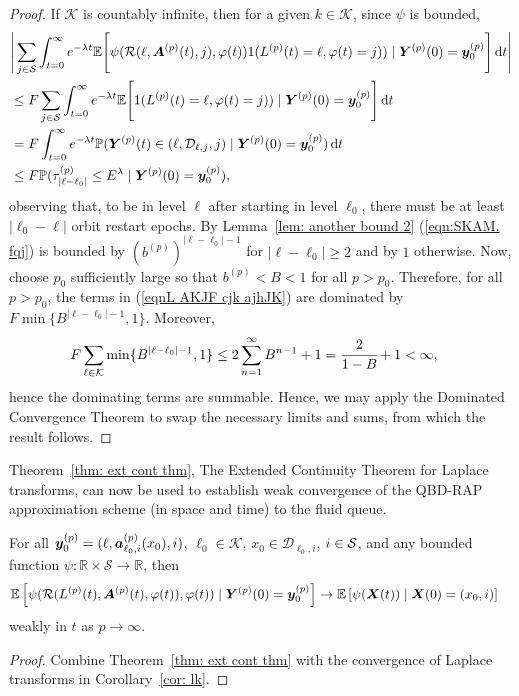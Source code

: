 \begin{proof}
	If \(\mathcal K\) is countably infinite, then for a given \(k\in\mathcal K\), since \(\psi\) is bounded,
	\begin{align}
		&\Bigg|\sum_{j\in\mathcal S}\int_{t=0}^\infty e^{-\lambda t}\mathbb E\Bigg[\psi( \mathcal R(\ell,\boldsymbol A^{(p)}(t),j),\varphi(t) )  1({L}^{(p)}(t)=\ell,\varphi(t)=j))  \mid \nonumber
		\boldsymbol Y^{(p)}(0)=\boldsymbol y_0^{(p)} \Bigg] \, \mathrm{d} t\Bigg| \nonumber 
		\\&\leq F \sum_{j\in\mathcal S}\int_{t=0}^\infty e^{-\lambda t}\mathbb E\Bigg[1({L}^{(p)}(t)=\ell,\varphi(t)=j))  \mid \nonumber
		\boldsymbol Y^{(p)}(0)=\boldsymbol y_0^{(p)}\Bigg] \, \mathrm{d} t \nonumber 
		\\&= F  \int_{t=0}^\infty e^{-\lambda t}\mathbb P( {\boldsymbol Y}^{(p)}(t)\in(\ell,\mathcal D_{\ell,j},j) \mid   
		\boldsymbol Y^{(p)}(0)=\boldsymbol y_0^{(p)})\, \mathrm{d} t \nonumber 
		\\&\leq F \mathbb P(\tau_{|\ell-\ell_0|}^{(p)}\leq E^\lambda \mid
			\boldsymbol Y^{(p)}(0)=\boldsymbol y_0^{(p)}), \label{eqn:SKAM. fqj}
	\end{align}
	observing that, to be in level \(\ell\) after starting in level \(\ell_0\), there must be at least \(|\ell_0-\ell|\) orbit restart epochs. By Lemma~\ref{lem: another bound 2} (\ref{eqn:SKAM. fqj}) is bounded by \(\left(b^{(p)}\right)^{|\ell-\ell_0|-1}\) for \(|\ell-\ell_0|\geq 2\) and by \(1\) otherwise. Now, choose \(p_0\) sufficiently large so that \(b^{(p)}<B<1\) for all \(p>p_0\). Therefore, for all \(p>p_0\), the terms in (\ref{eqnL AKJF cjk ajhJK}) are dominated by \(F\min\{B^{|\ell-\ell_0|-1},1\}\). Moreover, 
	\begin{align*}
		F\sum_{\ell\in\mathcal K} \min\{B^{|\ell-\ell_0|-1},1\} 
		&\leq2\sum_{n=1}^\infty B^{n-1}+1
		=\cfrac{2}{1-B}+1
		<\infty,
	\end{align*}
	hence the dominating terms are summable. Hence, we may apply the Dominated Convergence Theorem to swap the necessary limits and sums, from which the result follows.
\end{proof} 

Theorem~\ref{thm: ext cont thm}, The Extended Continuity Theorem for Laplace transforms, can now be used to establish weak convergence of the QBD-RAP approximation scheme (in space and time) to the fluid queue. 

\begin{thm}\label{thm: big thm}
	For all \(\boldsymbol y_0^{(p)}=(\ell,\boldsymbol a_{\ell_0,i}^{(p)}(x_0),i)\), \(\ell_0\in\mathcal K\), \(x_0\in\mathcal D_{\ell_0,i}\), \(i\in\mathcal{S}\), and any bounded function \(\psi:\mathbb R\times \mathcal S \to \mathbb R\), then
	\begin{align}
			&\mathbb E\left[\psi( \mathcal R(L^{(p)}(t),\boldsymbol A^{(p)}(t),\varphi(t)),\varphi(t) )   \mid \boldsymbol Y^{(p)}(0)=\boldsymbol y_0^{(p)} \right] \nonumber 
			\to \mathbb E\left[\psi({\boldsymbol X}(t))\mid \boldsymbol X(0)=(x_0, i) \right] \nonumber
	\end{align}
	weakly in \(t\) as \(p\to \infty\). 
\end{thm}
\begin{proof}
	Combine Theorem~\ref{thm: ext cont thm} with the convergence of Laplace transforms in Corollary~\ref{cor: lk}. 
\end{proof}

